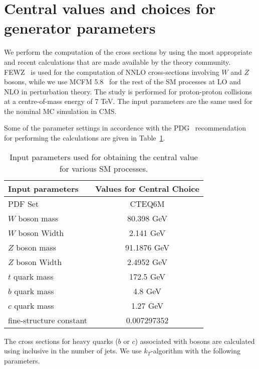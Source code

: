 \section{Central values and choices for generator parameters}
\label{sec:assumptions}
We perform the computation of the cross sections by using the most 
appropriate and recent calculations that are made available by the 
theory community. FEWZ~\cite{fewz} is used for the computation of NNLO 
cross-sections involving $W$ and $Z$ bosons, while we use 
MCFM 5.8~\cite{mcfm} for the rest of the SM processes at LO and NLO in 
perturbation theory. The study is performed for proton-proton collisions at 
a centre-of-mass energy of 7 TeV. The input parameters are the same used for 
the nominal MC simulation in CMS.

Some of the parameter settings in accordence with the PDG~\cite{pdg} 
recommendation for performing the calculations are given in 
Table~\ref{tab:input_params}.

\vspace{0.9mm}
\begin{table}[hbt]
\begin{center}
\renewcommand{\arraystretch}{1.2}
\begin{tabular}{|l|c|}\hline
Input parameters & Values for Central Choice \\ \hline
PDF Set & CTEQ6M \\ \hline
$W$ boson mass & 80.398 GeV \\ \hline	
$W$ boson Width & 2.141 GeV \\ \hline	
$Z$ boson mass & 91.1876 GeV \\ \hline	
$Z$ boson Width & 2.4952 GeV \\ \hline	
$t$ quark mass & 172.5 GeV \\ \hline	
$b$ quark mass & 4.8 GeV \\ \hline	
$c$ quark mass & 1.27 GeV \\ \hline	
fine-structure constant &  0.007297352 \\ \hline	
\end{tabular} 
\caption{Input parameters used for obtaining the central value for various 
SM processes.\label{tab:input_params}}
\end{center}
\end{table}

The cross sections for heavy quarks ($b$ or $c$) associated with bosons 
are calculated using inclusive in the number of jets. We use $k_T$-algorithm
with the following parameters.

